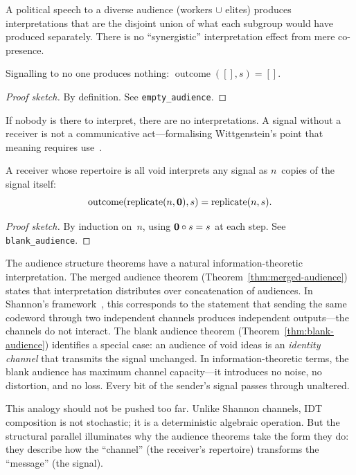 \begin{remark}
A political speech to a diverse audience (workers $\cup$ elites) produces
interpretations that are the disjoint union of what each subgroup would
have produced separately.  There is no ``synergistic'' interpretation
effect from mere co-presence.
\end{remark}

\begin{theorem}
\label{thm:empty-audience}
Signalling to no one produces nothing:
$\operatorname{outcome}([], s) = []$.
\end{theorem}

\begin{proof}[Proof sketch]
By definition.  See \texttt{empty\_audience}.
\end{proof}

\begin{remark}
If nobody is there to interpret, there are no interpretations.  A signal
without a receiver is not a communicative act---formalising Wittgenstein's
point that meaning requires use~\cite{wittgenstein1953}.
\end{remark}

\begin{theorem}
\label{thm:blank-audience}
A receiver whose repertoire is all void interprets any signal as
$n$~copies of the signal itself:
\[
  \operatorname{outcome}(\operatorname{replicate}(n, \mathbf{0}), s)
  = \operatorname{replicate}(n, s).
\]
\end{theorem}

\begin{proof}[Proof sketch]
By induction on~$n$, using $\mathbf{0} \circ s = s$ at each step.
See \texttt{blank\_audience}.
\end{proof}

\begin{remark}
\label{rem:info-theory}
The audience structure theorems have a natural information-theoretic
interpretation.  The merged audience theorem
(Theorem~\ref{thm:merged-audience}) states that interpretation
distributes over concatenation of audiences.  In Shannon's
framework~\cite{shannon1948}, this corresponds to the statement that
sending the same codeword through two independent channels produces
independent outputs---the channels do not interact.  The blank audience
theorem (Theorem~\ref{thm:blank-audience}) identifies a special case:
an audience of void ideas is an \emph{identity channel} that transmits
the signal unchanged.  In information-theoretic terms, the blank
audience has maximum channel capacity---it introduces no noise, no
distortion, and no loss.  Every bit of the sender's signal passes
through unaltered.

This analogy should not be pushed too far.  Unlike Shannon channels,
IDT composition is not stochastic; it is a deterministic algebraic
operation.  But the structural parallel illuminates why the audience
theorems take the form they do: they describe how the ``channel''
(the receiver's repertoire) transforms the ``message'' (the signal).
\end{remark}

